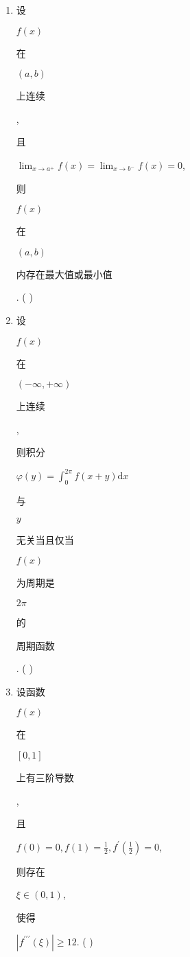 \documentclass[10pt]{article}
\begin{document}
\begin{enumerate}
  \item \begin{CJK}{UTF8}{mj}设\end{CJK} $f(x)$ \begin{CJK}{UTF8}{mj}在\end{CJK} $(a, b)$ \begin{CJK}{UTF8}{mj}上连续\end{CJK}, \begin{CJK}{UTF8}{mj}且\end{CJK} $\lim _{x \rightarrow a^{+}} f(x)=\lim _{x \rightarrow b^{-}} f(x)=0$, \begin{CJK}{UTF8}{mj}则\end{CJK} $f(x)$ \begin{CJK}{UTF8}{mj}在\end{CJK} $(a, b)$ \begin{CJK}{UTF8}{mj}内存在最大值或最小值\end{CJK}. ( )

  \item \begin{CJK}{UTF8}{mj}设\end{CJK} $f(x)$ \begin{CJK}{UTF8}{mj}在\end{CJK} $(-\infty,+\infty)$ \begin{CJK}{UTF8}{mj}上连续\end{CJK}, \begin{CJK}{UTF8}{mj}则积分\end{CJK} $\varphi(y)=\int_{0}^{2 \pi} f(x+y) \mathrm{d} x$ \begin{CJK}{UTF8}{mj}与\end{CJK} $y$ \begin{CJK}{UTF8}{mj}无关当且仅当\end{CJK} $f(x)$ \begin{CJK}{UTF8}{mj}为周期是\end{CJK} $2 \pi$ \begin{CJK}{UTF8}{mj}的\end{CJK} \begin{CJK}{UTF8}{mj}周期函数\end{CJK}. ( )

  \item \begin{CJK}{UTF8}{mj}设函数\end{CJK} $f(x)$ \begin{CJK}{UTF8}{mj}在\end{CJK} $[0,1]$ \begin{CJK}{UTF8}{mj}上有三阶导数\end{CJK}, \begin{CJK}{UTF8}{mj}且\end{CJK} $f(0)=0, f(1)=\frac{1}{2}, f^{\prime}\left(\frac{1}{2}\right)=0$, \begin{CJK}{UTF8}{mj}则存在\end{CJK} $\xi \in(0,1)$, \begin{CJK}{UTF8}{mj}使得\end{CJK} $\left|f^{\prime \prime \prime}(\xi)\right| \geqslant 12$. ( )


\end{enumerate}
\end{document}
